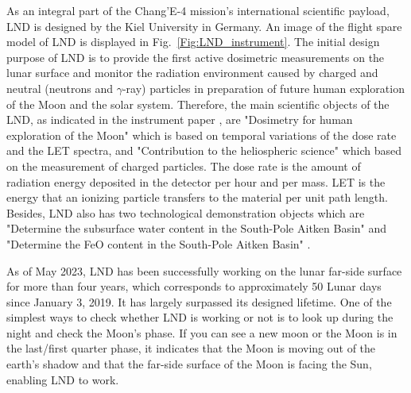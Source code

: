 As an integral part of the Chang'E-4 mission's international scientific payload, \acl{LND} is designed by the Kiel University in Germany. An image of the flight spare model of \ac{LND} is displayed in Fig.~\ref{Fig:LND_instrument}. 
The initial design purpose of \ac{LND} is to provide the first active 
dosimetric measurements on the lunar surface and monitor the radiation environment caused by charged and neutral (neutrons and $\gamma$-ray) particles in preparation of future human exploration of the Moon and the solar system. Therefore, the main scientific objects of the \ac{LND}, as indicated in the instrument paper \citep{Wimmer2020SSRv}, are "Dosimetry for human exploration of the Moon" which is based on temporal variations of the dose rate and the \ac{LET} spectra, and "Contribution to the heliospheric science" which based on the measurement of charged particles. The dose rate is the amount of radiation energy deposited in the detector per hour and per mass. \ac{LET} is the energy that an ionizing particle transfers to the material per unit path length.
Besides, \ac{LND} also has two technological demonstration objects which are "Determine the subsurface water content in the South-Pole Aitken Basin" and "Determine the FeO content in the South-Pole Aitken Basin" \citep{Wimmer2020SSRv}.

As of May 2023, \ac{LND} has been successfully working on the lunar far-side surface for more than four years, which corresponds to approximately 50 Lunar days since January 3, 2019. It has largely surpassed its designed lifetime.
One of the simplest ways to check whether LND is working or not is to look up during the night and check the Moon's phase. If you can see a new moon or the Moon is in the last/first quarter phase, it indicates that the Moon is moving out of the earth's shadow and that the far-side surface of the Moon is facing the Sun, enabling \ac{LND} to work.


